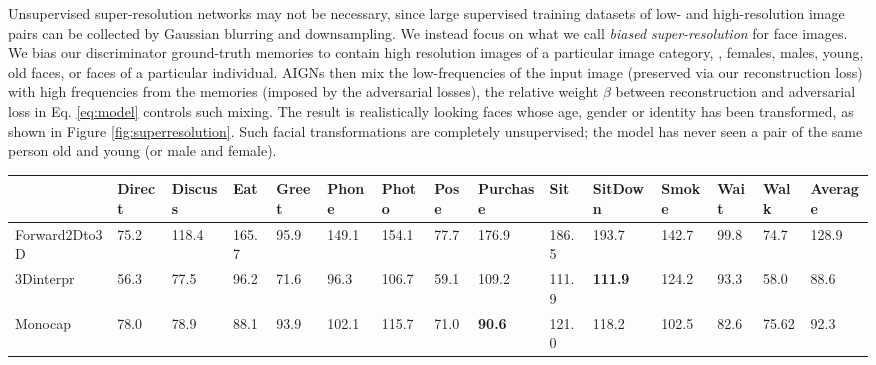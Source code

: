 \documentclass[10pt,twocolumn,letterpaper]{article}
\begin{document}
\begin{bibunit}[ieee]
Unsupervised super-resolution networks \cite{sonderby2014apparent} may not be necessary, since  large supervised training datasets of low- and high-resolution image pairs can be collected by Gaussian blurring and downsampling.   
We instead focus on what we call \textit{biased super-resolution} for face images. We  bias our discriminator ground-truth memories to contain high resolution images of a particular image category, \eg, females, males, young, old faces, or faces of a particular individual. AIGNs  then mix the low-frequencies of the input image (preserved via our reconstruction loss) with high frequencies from the memories (imposed by the adversarial losses), the relative weight $\beta$ between reconstruction and adversarial loss in Eq. \ref{eq:model} controls such mixing.  The result is realistically looking  faces whose age, gender or identity has been  transformed, as shown in Figure  \ref{fig:superresolution}. 
Such facial transformations are completely unsupervised; the model has never seen a pair of the same person old and young (or male and female). %
\centering
\begin{tabular}{K{0.12\textwidth}K{0.04\textwidth}K{0.04\textwidth}K{0.03\textwidth}K{0.03\textwidth}K{0.03\textwidth}K{0.04\textwidth}K{0.03\textwidth}K{0.05\textwidth}K{0.04\textwidth}K{0.05\textwidth}K{0.04\textwidth}K{0.03\textwidth}K{0.03\textwidth}K{0.05\textwidth}}
 \hline
  & Direct & Discuss & Eat & Greet & Phone & Photo & Pose & Purchase & Sit & SitDown & Smoke & Wait& Walk &  Average\\
 \hline
  Forward2Dto3D & 75.2 & 118.4 & 165.7 & 95.9 & 149.1 & 154.1 & 77.7 & 176.9 & 186.5 & 193.7 & 142.7 & 99.8 &  74.7 &  128.9\\
  3Dinterpr \cite{Wu2016} & 56.3 & 77.5 & 96.2 & 71.6 & 96.3 & 106.7 & 59.1 & 109.2 &111.9 & {\bf 111.9} & 124.2 & 93.3 & 58.0  & 88.6 \\
    Monocap \cite{DBLP:journals/corr/ZhouZPLDD17}&  78.0 & 78.9 & 88.1 & 93.9 & 102.1 & 115.7 & 71.0 & {\bf 90.6} &  121.0 & 118.2 & 102.5 & 82.6 &  75.62 &  92.3  \\

\end{tabular}
\end{bibunit}
\end{document}
